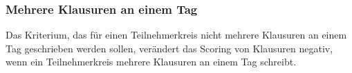 \subsubsection{Mehrere Klausuren an einem Tag}
Das Kriterium, das für einen Teilnehmerkreis nicht mehrere Klausuren an einem Tag geschrieben
werden sollen, verändert das Scoring von Klausuren negativ, wenn ein Teilnehmerkreis
mehrere Klausuren an einem Tag schreibt.